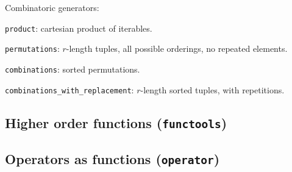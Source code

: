 Combinatoric generators:
\begin{compactenum}
\item \texttt{product}: cartesian product of iterables.
\item \texttt{permutations}: $r$-length tuples, all possible orderings, no repeated elements.
\item \texttt{combinations}: sorted permutations.
\item \texttt{combinations_with_replacement}: $r$-length sorted tuples, with repetitions.
\end{compactenum}

\subsection{Higher order functions (\texttt{functools})}

\subsection{Operators as functions (\texttt{operator})}

